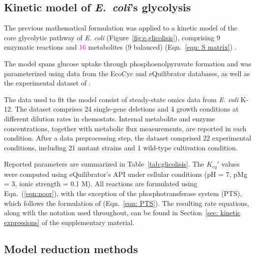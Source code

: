 \documentclass[conference]{IEEEtran}
\begin{document}
\subsection{Kinetic model of \textit{E.~coli}'s glycolysis}

The previous mathematical formulation was applied to a kinetic model of the core glycolytic pathway of \textit{E. coli} (Figure~\ref{fig:e.glicolisis}), comprising 9 enzymatic reactions and \textcolor{magenta}{16} metabolites (9 balanced) (Eqn.~\ref{eqn: S matrix}) \cite{Guerra2025CONSTRUCTIONKINETICMODELSMETABOLISMUSINGSYSTEMSINFORMEDPRIORS}.

The model spans glucose uptake through phosphoenolpyruvate formation and was parameterized using data from the EcoCyc \cite{karp2025ecocyc} and eQuilibrator \cite{beber2022equilibrator} databases, as well as the experimental dataset of \textcite{Ishii2007a}.

The data used to fit the model consist of steady-state omics data from \textit{E. coli} K-12. The dataset comprises 24 single-gene deletions and 4 growth conditions at different dilution rates in chemostats. Internal metabolite and enzyme concentrations, together with metabolic flux measurements, are reported in each condition. After a data preprocessing step, the dataset comprised 22 experimental conditions, including 21 mutant strains and 1 wild-type cultivation condition.

Reported parameters are summarized in Table~\ref{tab:glicolisis}. The $K_{eq}'$ values were computed using eQuilibrator's API under cellular conditions (pH = 7, pMg = 3, ionic strength = 0.1 M).
All reactions are formulated using Eqn.~(\ref{eqn:noor}), with the exception of the phosphotransferase system (PTS), which follows the formulation of \textcite{Kadir2010ModelingsimulationmainmetabolismEscherichiacoliitsseveralsinglegeneknockoutmutantsexperimentalverification} (Eqn.~\ref{eqn: PTS}). The resulting rate equations, along with the notation used throughout, can be found in Section~\ref{sec: kinetic expressions} of the supplementary material.

\subsection{Model reduction methods}
\end{document}
